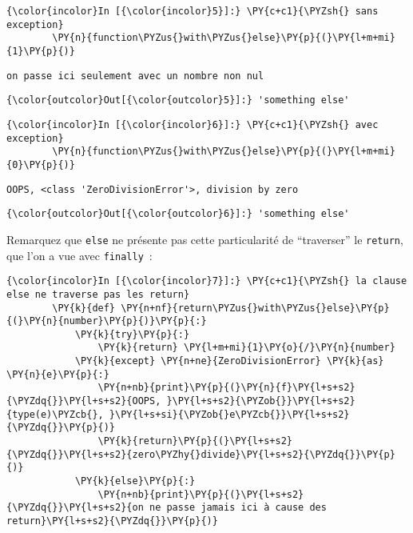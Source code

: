     \begin{Verbatim}[commandchars=\\\{\}]
{\color{incolor}In [{\color{incolor}5}]:} \PY{c+c1}{\PYZsh{} sans exception}
        \PY{n}{function\PYZus{}with\PYZus{}else}\PY{p}{(}\PY{l+m+mi}{1}\PY{p}{)}
\end{Verbatim}


    \begin{Verbatim}[commandchars=\\\{\}]
on passe ici seulement avec un nombre non nul

    \end{Verbatim}

\begin{Verbatim}[commandchars=\\\{\}]
{\color{outcolor}Out[{\color{outcolor}5}]:} 'something else'
\end{Verbatim}
            
    \begin{Verbatim}[commandchars=\\\{\}]
{\color{incolor}In [{\color{incolor}6}]:} \PY{c+c1}{\PYZsh{} avec exception}
        \PY{n}{function\PYZus{}with\PYZus{}else}\PY{p}{(}\PY{l+m+mi}{0}\PY{p}{)}
\end{Verbatim}


    \begin{Verbatim}[commandchars=\\\{\}]
OOPS, <class 'ZeroDivisionError'>, division by zero

    \end{Verbatim}

\begin{Verbatim}[commandchars=\\\{\}]
{\color{outcolor}Out[{\color{outcolor}6}]:} 'something else'
\end{Verbatim}
            
    Remarquez que \texttt{else} ne présente pas cette particularité de
``traverser'' le \texttt{return}, que l'on a vue avec \texttt{finally}~:

    \begin{Verbatim}[commandchars=\\\{\}]
{\color{incolor}In [{\color{incolor}7}]:} \PY{c+c1}{\PYZsh{} la clause else ne traverse pas les return}
        \PY{k}{def} \PY{n+nf}{return\PYZus{}with\PYZus{}else}\PY{p}{(}\PY{n}{number}\PY{p}{)}\PY{p}{:}
            \PY{k}{try}\PY{p}{:}
                \PY{k}{return} \PY{l+m+mi}{1}\PY{o}{/}\PY{n}{number}
            \PY{k}{except} \PY{n+ne}{ZeroDivisionError} \PY{k}{as} \PY{n}{e}\PY{p}{:}
                \PY{n+nb}{print}\PY{p}{(}\PY{n}{f}\PY{l+s+s2}{\PYZdq{}}\PY{l+s+s2}{OOPS, }\PY{l+s+s2}{\PYZob{}}\PY{l+s+s2}{type(e)\PYZcb{}, }\PY{l+s+si}{\PYZob{}e\PYZcb{}}\PY{l+s+s2}{\PYZdq{}}\PY{p}{)}
                \PY{k}{return}\PY{p}{(}\PY{l+s+s2}{\PYZdq{}}\PY{l+s+s2}{zero\PYZhy{}divide}\PY{l+s+s2}{\PYZdq{}}\PY{p}{)}
            \PY{k}{else}\PY{p}{:}
                \PY{n+nb}{print}\PY{p}{(}\PY{l+s+s2}{\PYZdq{}}\PY{l+s+s2}{on ne passe jamais ici à cause des return}\PY{l+s+s2}{\PYZdq{}}\PY{p}{)}
\end{Verbatim}


